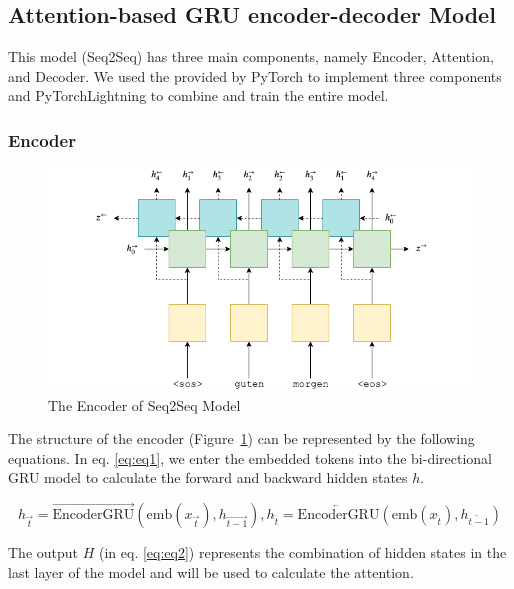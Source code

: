 \subsection{Attention-based GRU encoder-decoder Model} \label{sec:rnn}

This model (Seq2Seq) has three main components, namely Encoder, Attention, and Decoder. We used the  provided by PyTorch to implement three components and PyTorchLightning to combine and train the entire model.

\subsubsection{Encoder}

\begin{figure}[H]
	\centering
	\includegraphics[scale=0.7]{../images/bi_encoder.png}
    \caption{The Encoder of Seq2Seq Model}
	\label{fig:seq2seq_encoder}
\end{figure}

The structure of the encoder (Figure~\ref{fig:seq2seq_encoder}) can be represented by the following equations. In eq. \ref{eq:eq1}, we enter the embedded tokens into the bi-directional GRU model to calculate the forward and backward hidden states $h$. 

\begin{equation}
    h_{\overrightarrow{t}} = \overrightarrow{\text{EncoderGRU}}(\text{emb}(x_{\overrightarrow{t}}), h_{\overrightarrow{t-1}}), 
    h_{\overleftarrow{t}} = \overleftarrow{\text{EncoderGRU}}(\text{emb}(x_{\overleftarrow{t}}), h_{\overleftarrow{t-1}})
    \label{eq:eq1}
\end{equation}

The output $H$ (in eq. \ref{eq:eq2}) represents the combination of hidden states in the last layer of the model and will be used to calculate the attention. 

